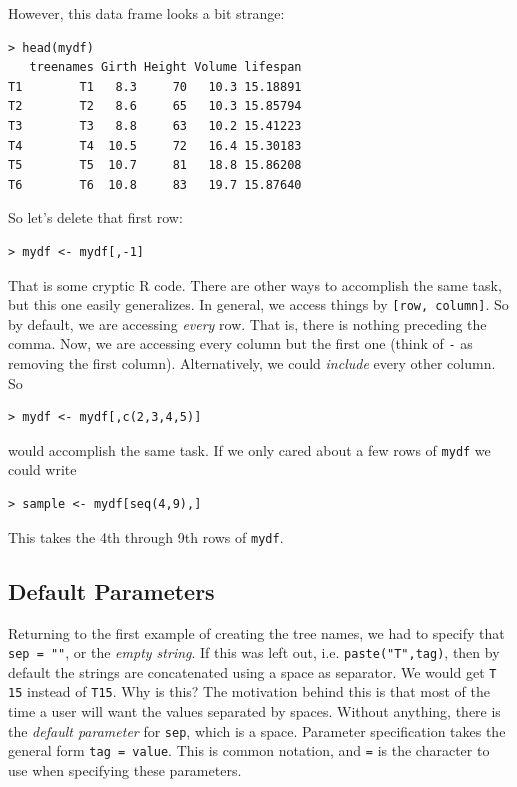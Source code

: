 \documentclass[12pt]{article}
\newtheorem{exercise}{Exercise}
\begin{document}
However, this data frame looks a bit strange:
\begin{Verbatim}[frame=single, fontsize=\small]
> head(mydf)
   treenames Girth Height Volume lifespan
T1        T1   8.3     70   10.3 15.18891
T2        T2   8.6     65   10.3 15.85794
T3        T3   8.8     63   10.2 15.41223
T4        T4  10.5     72   16.4 15.30183
T5        T5  10.7     81   18.8 15.86208
T6        T6  10.8     83   19.7 15.87640
\end{Verbatim}
So let's delete that first row:
\begin{verbatim}
> mydf <- mydf[,-1]
\end{verbatim}

That is some cryptic R code. There are other ways to accomplish the same task, but this one easily generalizes. In general, we access things by \verb|[row, column]|. So by default, we are accessing \emph{every} row. That is, there is nothing preceding the comma. Now, we are accessing every column but the first one (think of \verb|-| as removing the first column). Alternatively, we could \emph{include} every other column. So
\begin{verbatim}
> mydf <- mydf[,c(2,3,4,5)]
\end{verbatim}
would accomplish the same task. If we only cared about a few rows of \verb|mydf| we could write
\begin{verbatim}
> sample <- mydf[seq(4,9),]
\end{verbatim}
This takes the 4th through 9th rows of \verb|mydf|.



\subsection{Default Parameters}
Returning to the first example of creating the tree names, we had to specify that \verb|sep = ""|, or the \emph{empty string}. If this was left out, i.e. \verb|paste("T",tag)|, then by default the strings are concatenated using a space as separator. We would get \verb|T 15| instead of \verb|T15|. Why is this? The motivation behind this is that most of the time a user will want the values separated by spaces. Without anything, there is the \emph{default parameter} for \verb|sep|, which is a space. Parameter specification takes the general form \verb|tag = value|. This is common notation, and \verb|=| is the character to use when specifying these parameters.
\end{document}
